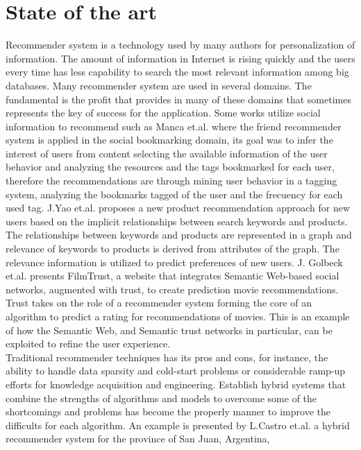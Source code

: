 \chapter{State of the art} \label{}

Recommender system is a technology used by many authors for
personalization of information. The amount of information in Internet
is rising quickly and the users every time has less capability to
search the most relevant information among big databases. Many
recommender  system are used in several domains. 
The fundamental is the profit that provides in many of
these domains that sometimes represents the key of success for the
application.  Some works utilize social information to recommend such
as Manca et.al.\cite{manca2014mining} where the friend recommender
system is applied in the social bookmarking domain, its goal was to
infer the interest of users from content selecting the available
information of the user behavior and analyzing the resources and the
tags bookmarked for each user, therefore the recommendations are
through mining user behavior in a tagging system, analyzing the
bookmarks tagged of the user and the frecuency for each used tag. 
J.Yao et.al.\cite{yao2012product} proposes a new product recommendation
approach for new users based on the implicit relationships between
search keywords and products. The relationships between keywords and
products are represented in a graph and relevance of keywords to
products is derived from attributes of the graph. The relevance
information is utilized to predict preferences of new users. J.
Golbeck et.al.\cite{golbeck2006filmtrust} presents FilmTrust, a
website that integrates Semantic Web-based social networks, augmented
with trust, to create prediction movie recommendations. Trust takes on
the role of a recommender system forming the core of an algorithm to
predict a rating for recommendations of movies. This is an example of
how the Semantic Web, and Semantic trust networks in particular, can
be exploited to refine the user experience. \\  
Traditional recommender techniques has its pros and cons, for
instance, the ability to handle data sparsity and cold-start problems
or considerable ramp-up efforts for knowledge acquisition and
engineering. Establish hybrid systems that combine the strengths of
algorithms and models to overcome some of the shortcomings and
problems has become the properly manner to improve the difficults for
each algorithm.
An example is presented by L.Castro et.al.\cite{castro2012prototype} 
a hybrid recommender system for the province of San Juan, Argentina, 
